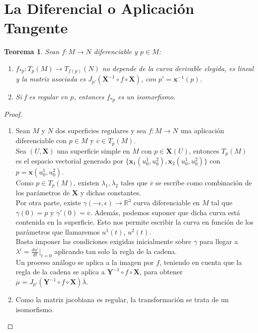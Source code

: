 \documentclass[a4paper,10pt]{book}
\newtheorem{thm}{Teorema}[chapter]
\newcommand{\RR}{\mathbb R}
\newcommand{\RRR}{\RR^3}
\begin{document}
\section{La Diferencial o Aplicación Tangente}
\begin{thm}
Sean $f:M\longrightarrow N$ diferenciable y $p\in M$:
\begin{enumerate}
\item[a)] $f_{*p}:T_p(M)\longrightarrow T_{f(p)}(N)$ no depende de la curva derivable elegida, es lineal y la matriz asociada es $J_{p'}(\textbf{X}^{-1}\circ f \circ \textbf{X})$, con $p'=\textbf{x}^{-1}(p)$.
\item[b)]Si f es regular en $p$, entonces $f_{*p}$ es un isomorfismo.
\end{enumerate}


\end{thm}
\begin{proof}
\begin{enumerate}
\item [a)]Sean $M$ y $N$ dos superficies regulares y sea $f:M\longrightarrow N$ una aplicación diferenciable con $p\in M$ y $\overline{v}\in T_p(M)$.\\
Sea $(U,\textbf{X})$ una superficie simple en $M$ con $p\in \textbf{X}(U)$, entonces $T_p(M)$ es el espacio vectorial generado por $\{\textbf{x}_1(u_0^1,u_0^2),\textbf{x}_2(u_0^1,u_0^2)\}$ con $p=\textbf{x}(u_0^1,u_0^2)$.\\
Como $p\in T_p(M)$, existen $\lambda_1,\lambda_2$ tales que $\overline{v}$ se escribe como combinación de los parámetros de $\textbf{X}$ y dichas constantes.\\
Por otra parte, existe $\gamma(-\epsilon,\epsilon)\longrightarrow\RRR$ curva diferenciable en $M$ tal que $\gamma(0)=p$ y $\gamma'(0)=\overline{v}$. Además, podemos suponer que dicha curva está contenida en la superficie. Esto nos permite escribir la curva en función de los parámetros que llamaremos $u^1(t)$, $u^2(t)$.\\
Basta imponer las condiciones exigidas inicialmente sobre $\gamma$ para llegar a $\lambda^i=\frac{du^i}{dt}|_{t=0}$ aplicando tan solo la regla de la cadena.\\
Un proceso análogo se aplica a la imagen por $f$, teniendo en cuenta que la regla de la cadena se aplica a $\textbf{Y}^{-1}\circ f \circ \textbf{X}$, para obtener $\overline{\mu}=J_{p'}(\textbf{Y}^{-1}\circ f \circ \textbf{X})\overline{\lambda}$.
\item [b)] Como la matriz jacobiana es regular, la transformación se trata de un isomorfismo.
\end{enumerate}
\end{proof}
\end{document}

